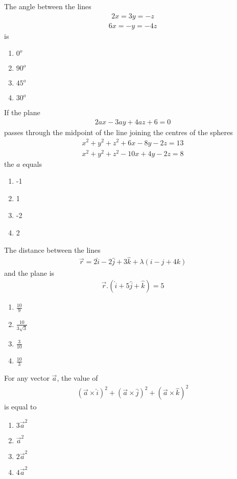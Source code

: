 \item The angle between the lines
\begin{align*}
2x = 3y = -z
\end{align*}
\begin{align*}
6x = -y = -4z
\end{align*}
is
\begin{enumerate}
\item $0^{o}$
\item $90^{o}$
\item $45^{o}$
\item $30^{o}$
\end{enumerate}

\item If the plane
\begin{align*}
2ax - 3ay + 4az + 6 = 0
\end{align*}
passes through the midpoint of the line joining the centres of the spheres
\begin{align}
x^2 + y^2 + z^2 + 6x - 8y - 2z = 13
\end{align}
\begin{align}
x^2 + y^2 + z^2 - 10x + 4y - 2z = 8
\end{align}
the $a$ equals
\begin{enumerate}
\item -1
\item 1
\item -2
\item 2
\end{enumerate}

\item The distance between the lines
\begin{align*}
\overrightarrow{r} = 2\hat{i} - 2\hat{j} + 3\hat{k} + \lambda(i - j + 4k)
\end{align*}
and the plane is 
\begin{align*}
\overrightarrow{r}.(\hat{i} + 5\hat{j} + \hat{k}) = 5
\end{align*}
\begin{enumerate}
\item $\frac{10}{9}$
\item $\frac{10}{3\sqrt{3}}$
\item $\frac{3}{10}$
\item $\frac{10}{3}$
\end{enumerate}

\item For any vector $\overrightarrow{a}$, the value of 
\begin{align*}
(\overrightarrow{a} \times \hat{i})^{2} + (\overrightarrow{a} \times \hat{j})^{2} + (\overrightarrow{a} \times \hat{k})^{2}
\end{align*}
is equal to
\begin{enumerate}
\item $3\overrightarrow{a}^{2}$
\item $\overrightarrow{a}^{2}$
\item $2\overrightarrow{a}^{2}$
\item $4\overrightarrow{a}^{2}$
\end{enumerate}


